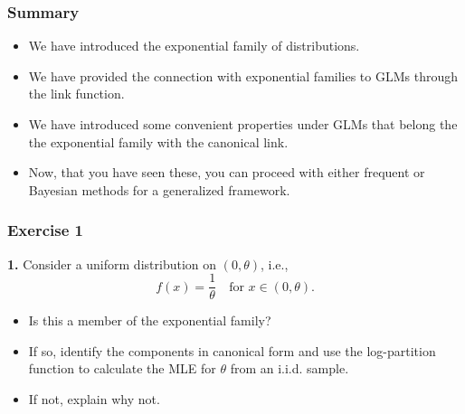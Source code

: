 \documentclass{beamer}
\begin{document}
\begin{frame}
\frametitle{Summary}

\begin{itemize}
\item We have introduced the exponential family of distributions.
\item We have provided the connection with exponential families to GLMs through the link function. 
\item We have introduced some convenient properties under GLMs that belong the the exponential family with the canonical link.
\item Now, that you have seen these, you can proceed with either frequent or Bayesian methods for a generalized framework. 
\end{itemize}



\end{frame}



%

\begin{frame}
\frametitle{Exercise 1}
\textbf{1.} Consider a uniform distribution on $(0,\theta)$, i.e., 
\[
f(x)=\frac{1}{\theta}\quad\text{for } x\in (0,\theta).
\]
\begin{itemize}
  \item Is this a member of the exponential family?
  \item If so, identify the components in canonical form and use the log-partition function to calculate the MLE for $\theta$ from an i.i.d. sample.
  \item If not, explain why not.
\end{itemize}
\end{frame}
\end{document}
